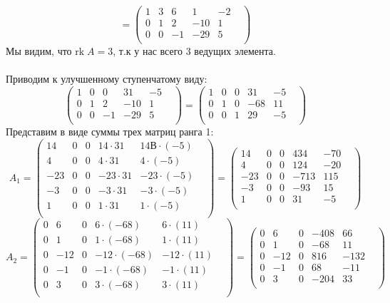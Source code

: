 \documentclass[a4paper,12pt]{article}
\begin{document}
\[
=
\begin{pmatrix}
1 & 3 & 6 & 1 & -2 & \\
0 & 1 & 2 & -10 & 1 & \\
0 & 0 & -1 & -29 & 5 & \\
\end{pmatrix}
\]
Мы видим, что $\text{rk} \; A = 3$, т.к у нас всего 3 ведущих элемента.
\\\\
Приводим к улучшенному  ступенчатому виду:
\[
\begin{pmatrix}
1 & 0 & 0 & 31 & -5 & \\
0 & 1 & 2 & -10 & 1 & \\
0 & 0 & -1 & -29 & 5 & \\
\end{pmatrix}
=
\begin{pmatrix}
1 & 0 & 0 & 31 & -5 & \\
0 & 1 & 0 & -68 & 11 & \\
0 & 0 & 1 & 29 & -5 & \\
\end{pmatrix}
\]
Представим в виде суммы трех матриц ранга 1:
\[
A_1 = 
\begin{pmatrix}
14 & 0& 0& 14 \cdot 31 & 1 4В\cdot (-5) & \\
4 & 0 & 0 & 4 \cdot 31& 4 \cdot (-5) & \\
-23 & 0 & 0 & -23  \cdot 31& -23  \cdot (-5)& \\
-3 & 0 & 0& -3 \cdot 31& -3  \cdot (-5)& \\
1 & 0& 0 & 1  \cdot 31& 1\cdot ( -5)& \\
\end{pmatrix} 
=
\begin{pmatrix}
14 & 0& 0& 434 & -70 & \\
4 & 0 & 0 & 124& -20& \\
-23 & 0 & 0 & -713& 115& \\
-3 & 0 & 0& -93& 15& \\
1 & 0& 0 & 31& -5& \\
\end{pmatrix} 
\]
\[
A_2 = 
\begin{pmatrix}
0 & 6 & 0 & 6 \cdot (-68) & 6\cdot (11)& \\
0 & 1 & 0&  1 \cdot (-68) & 1\cdot (11) & \\
0& -12 & 0 & -12  \cdot (-68)  & -12 \cdot (11)& \\
0 & -1 & 0 & -1  \cdot (-68) & -1 \cdot (11)& \\
0& 3 & 0 & 3  \cdot (-68)  & 3 \cdot (11) & \\
\end{pmatrix} 
=
\begin{pmatrix}
0 & 6 & 0 & -408 & 66& \\
0 & 1 & 0&   -68 & 11& \\
0& -12 & 0 & 816 & -132& \\
0 & -1 & 0 & 68 & -11& \\
0& 3 & 0 & -204 & 33 & \\
\end{pmatrix} 
\]
\end{document}
